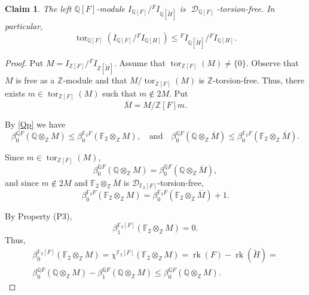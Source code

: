 \documentclass{amsart}
\newtheorem{claim}[lem]{Claim}
\theoremstyle{definition}
\theoremstyle{remark}
\DeclareMathOperator{\D}{\mathcal D}
\DeclareMathOperator{\tor}{tor}
\newcommand{\Q}{\mathbb{Q}}
\begin{document}
\begin{claim} 
The left $\Q[F]$-module $I_{\Q[F]}/{}^FI_{\Q[\widetilde H]}$ is $\D_{\Q[F]}$-torsion-free. In particular, $$ \tor_{\Q[F]}(I_{\Q[F]}/{}^FI_{\Q[H]})\leq {}^FI_{\Q[\widetilde H]}/{}^FI_{\Q[H]}.$$
\end{claim}
\begin{proof}Put 
\(
M = I_{\mathbb{Z}[F]}/{}^{F}I_{\mathbb{Z}[\widetilde{H}]}.
\)
Assume that $\tor_{\mathbb{Z}[F]}(M) \neq \{0\}$. Observe that $M$ is free as a $\mathbb{Z}$-module and that $M / \tor_{\mathbb{Z}[F]}(M)$ is $\mathbb{Z}$-torsion-free. Thus, there exists $m \in \tor_{\mathbb{Z}[F]}(M)$ such that $m \notin 2M$.  
Put 
\[
\overline{M} = M / \mathbb{Z}[F]m.
\]

By \cref{Qp} we have
\begin{equation}\label{desQf2}
\beta_0^{\mathbb{Q}F}\!\left(\mathbb{Q} \otimes_{\mathbb{Z}} M\right) 
   \leq \beta_0^{\mathbb{F}_2 F}\!\left(\mathbb{F}_2 \otimes_{\mathbb{Z}} M\right),
   \quad\text{and}\quad
\beta_0^{\mathbb{Q}F}\!\left(\mathbb{Q} \otimes_{\mathbb{Z}} \overline{M}\right) 
   \leq \beta_0^{\mathbb{F}_2 F}\!\left(\mathbb{F}_2 \otimes_{\mathbb{Z}} \overline{M}\right).
\end{equation}

Since $m \in \tor_{\mathbb{Z}[F]}(M)$,
\begin{equation}
 \label{igQ}
\beta_0^{\mathbb{Q}F}\!\left(\mathbb{Q} \otimes_{\mathbb{Z}} M\right) 
   = \beta_0^{\mathbb{Q}F}\!\left(\mathbb{Q} \otimes_{\mathbb{Z}} \overline{M}\right),
\end{equation}
and since $m \notin 2M$ and $\mathbb{F}_2 \otimes_{\mathbb{Z}} \overline{M}$ is $\mathcal{D}_{\mathbb{F}_2[F]}$-torsion-free,
\begin{equation}
    \label{desF2}
\beta_0^{\mathbb{F}_2 F}\!\left(\mathbb{F}_2 \otimes_{\mathbb{Z}} M\right) 
   = \beta_0^{\mathbb{F}_2 F}\!\left(\mathbb{F}_2 \otimes_{\mathbb{Z}} \overline{M}\right) + 1.
\end{equation}

By Property (P3), 
\[
\beta_1^{\mathbb{F}_2[F]}\!\left(\mathbb{F}_2 \otimes_{\mathbb{Z}} M\right) = 0.
\] 
Thus, 
\begin{multline*}
\beta_0^{\mathbb{F}_2[F]}\!\left(\mathbb{F}_2 \otimes_{\mathbb{Z}} M\right) 
   = \chi^{\mathbb{F}_2[F]}\!\left(\mathbb{F}_2 \otimes_{\mathbb{Z}} M\right) =\operatorname{rk}(F) - \operatorname{rk}(\widetilde{H}) 
   = \\ \beta_0^{\mathbb{Q}F}\!\left(\mathbb{Q} \otimes_{\mathbb{Z}} M\right) 
     - \beta_1^{\mathbb{Q}F}\!\left(\mathbb{Q} \otimes_{\mathbb{Z}} M\right) 
   \leq \beta_0^{\mathbb{Q}F}\!\left(\mathbb{Q} \otimes_{\mathbb{Z}} M\right).
\end{multline*}


\end{proof}
\end{document}
